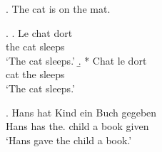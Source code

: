 \documentclass{article}
\begin{document}
\ex.\label{ex:basic} The cat is on the mat.

\ex.\label{ex:para} \a. \gll Le chat dort\\
                 the cat sleeps\\
     \glt `The cat sleeps.'
\b. * \gll Chat le dort\\
           cat the sleeps\\
     \glt `The cat sleeps.'

\ex. \gll Hans hat  Kind {ein Buch} gegeben\\
          Hans has the. child a book given\\
\glt `Hans gave the child a book.'
\end{document}
